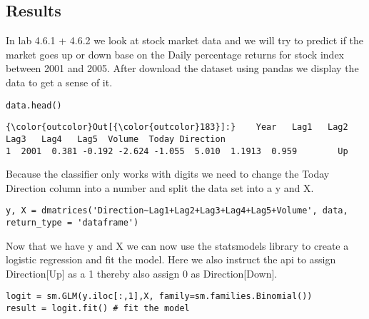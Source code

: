 \subsection{Results}
In lab 4.6.1 + 4.6.2 we look at stock market data and we will try to predict if the market goes up or down base on the Daily percentage returns for stock index between 2001 and 2005.
After download the dataset using pandas we display the data to get a sense of it.
\begin{lstlisting}
data.head()
\end{lstlisting}
\begin{Verbatim}[commandchars=\\\{\}]
{\color{outcolor}Out[{\color{outcolor}183}]:}    Year   Lag1   Lag2   Lag3   Lag4   Lag5  Volume  Today Direction
1  2001  0.381 -0.192 -2.624 -1.055  5.010  1.1913  0.959        Up
\end{Verbatim}
Because the classifier only works with digits we need to change the Today Direction column into a number and split the data set into a y and X.
\begin{lstlisting}
y, X = dmatrices('Direction~Lag1+Lag2+Lag3+Lag4+Lag5+Volume', data, return_type = 'dataframe')
\end{lstlisting}
Now that we have y and X we can now use the statsmodels library to create a logistic regression and fit the model. Here we also instruct the api to assign Direction[Up] as a 1 thereby also assign 0 as Direction[Down].
\begin{lstlisting}
logit = sm.GLM(y.iloc[:,1],X, family=sm.families.Binomial())
result = logit.fit() # fit the model
\end{lstlisting}


